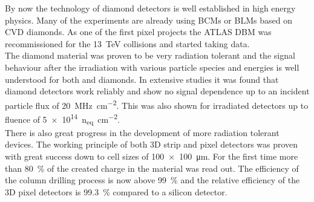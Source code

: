 By now the technology of diamond detectors is well established in high energy physics. Many of the experiments are already using \acp{BCM} or \acp{BLM} based on \ac{CVD} diamonds. As one of the first pixel projects the ATLAS \ac{DBM}  was recommissioned for the \SI{13}{\tera\electronvolt} collisions and started taking data.\\
The diamond material was proven to be very radiation tolerant and the signal behaviour after the irradiation with various particle species and energies is well understood for both \sccvd and \pcvd diamonds. In extensive studies it was found that \pcvd diamond detectors work reliably and show no signal dependence up to an incident particle flux of \SI{20}{\mega\hertz\per\centi\meter^2}. This was also shown for irradiated detectors up to fluence of \SI{5e14}{n_{eq}\per \centi\meter^2}.\\
There is also great progress in the development of more radiation tolerant devices. The working principle of both 3D strip and pixel detectors was proven with great success down to cell sizes of \SI{100x100}{\micro\meter}. For the first time more than \SI{80}{\%} of the created charge in the material was read out. The efficiency of the column drilling process is now above \SI{99}{\%} and the relative efficiency of the 3D pixel detectors is \SI{99.3}{\%} compared to a silicon detector.